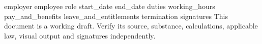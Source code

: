 \documentclass[11pt,a4paper]{article}
\begin{document}
{{employer}}
{{employee}}
{{role}}
{{start_date}}
{{end_date}}
{{duties}}
{{working_hours}}
{{pay_and_benefits}}
{{leave_and_entitlements}}
{{termination}}
{{signatures}}
This document is a working draft. Verify its source, substance, calculations, applicable law, visual output and signatures independently.
\end{document}
